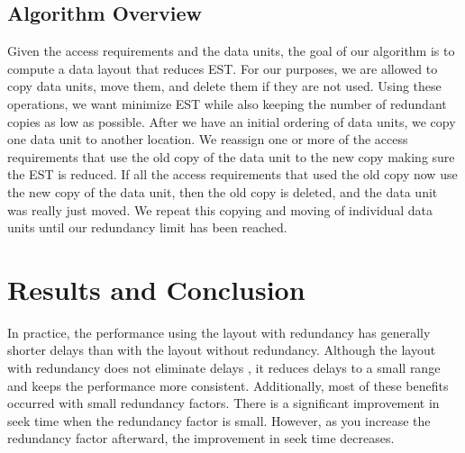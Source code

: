 \subsection{Algorithm Overview}

Given the access requirements and the data units, the goal of our algorithm is to compute a data layout that reduces EST.  For our purposes, we are allowed to copy data units, move them, and
delete them if they are not used. Using these operations, we want minimize EST
while also keeping the number of redundant copies as low as possible. 
After we have an initial ordering of data units, we copy one data unit
to another location. We reassign one or more of the access requirements that
use the old copy of the data unit to the new copy making sure the EST is
reduced.  If all the access requirements that used the old copy now use the
new copy of the data unit, then the old copy is deleted, and the data unit was really just moved.  We repeat this
copying and moving of individual data units until our redundancy
limit has been reached. 

\section{Results and Conclusion}

In practice, the performance using the layout with redundancy has generally shorter delays than with the layout without redundancy. Although the layout with redundancy does not eliminate delays , it reduces delays to a small range and keeps the performance more consistent. Additionally, most of these benefits occurred with small redundancy factors. There is a significant improvement in seek time when the redundancy factor is small. However, as you increase the redundancy factor afterward, the improvement in seek time decreases.

